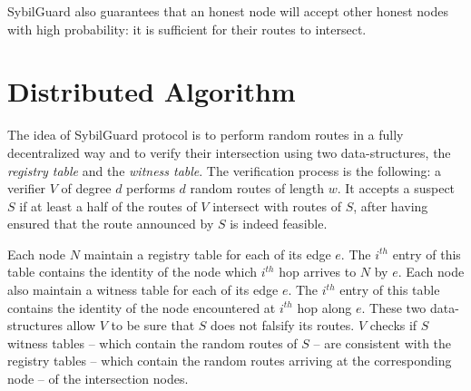 \documentclass[a4paper,11pt]{article}
\begin{document}
SybilGuard also guarantees that an honest node will accept other honest
nodes with high probability: it is sufficient for their routes to
intersect.


\section{Distributed Algorithm}


The idea of SybilGuard protocol is to perform random routes in a fully
decentralized way and to verify their intersection using two
data-structures, the \emph{registry table} and the \emph{witness
table}. The verification process is the following: a verifier $V$ of
degree $d$ performs $d$ random routes of length $w$. It accepts a
suspect $S$ if at least a half of the routes of $V$ intersect with
routes of $S$, after having ensured that the route announced by $S$ is
indeed feasible.


Each node $N$ maintain a registry table for each of its edge $e$.  The
$i^{th}$ entry of this table contains the identity of the node which
$i^{th}$ hop arrives to $N$ by $e$.  Each node also maintain a witness
table for each of its edge $e$.  The $i^{th}$ entry of this table
contains the identity of the node encountered at $i^{th}$ hop along
$e$.  These two data-structures allow $V$ to be sure that $S$ does not
falsify its routes. $V$ checks if $S$ witness tables -- which contain
the random routes of $S$ -- are consistent with the registry tables --
which contain the random routes arriving at the corresponding node --
of the intersection nodes.
\end{document}
